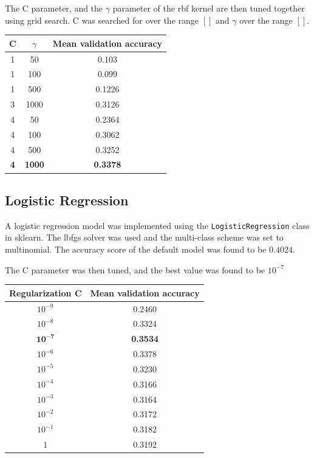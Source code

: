 \documentclass[12pt]{article}
\begin{document}
The C parameter, and the $\gamma$ parameter of the rbf kernel are then tuned together using grid search. C was searched for over the range $[]$ and $\gamma$ over the range $[]$.

\begin{center}
 \begin{tabular}{|c|c|c|}
  \hline
  C & $\gamma$ & Mean validation accuracy \\
  \hline
  1 & 50 & 0.103\\
  1 & 100 & 0.099\\
  1 & 500 & 0.1226\\
  3 & 1000 & 0.3126\\ 
  4 & 50 & 0.2364\\
  4 & 100 & 0.3062\\
  4 & 500 & 0.3252\\
  \textbf{4} & \textbf{1000} & \textbf{0.3378}\\ 
  \hline
 \end{tabular}

\end{center}

\subsection*{Logistic Regression}

A logistic regression model was implemented using the \texttt{LogisticRegression} class in sklearn. The lbfgs solver was used and the multi-class scheme was set to multinomial. The accuracy score of the default model was found to be $0.4024$.

The C parameter was then tuned, and the best value was found to be $10^{-7}$

\begin{center}
\begin{tabular}{|c|c|}
 \hline
 Regularization C& Mean validation accuracy \\
 \hline
  $10^{-9}$& 0.2460\\
 $10^{-8}$ & 0.3324\\
 $\mathbf{10^{-7}}$ & \textbf{0.3534}\\
 $10^{-6}$ & 0.3378\\
 $10^{-5}$ & 0.3230\\
 $10^{-4}$ & 0.3166\\
 $10^{-3}$ & 0.3164\\
 $10^{-2}$ & 0.3172\\
 $10^{-1}$ & 0.3182\\
 $1$ & 0.3192\\
 \hline
\end{tabular}
\end{center}
\end{document}
